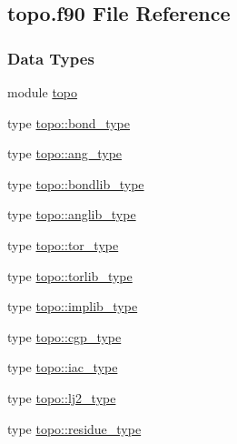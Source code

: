 \hypertarget{topo_8f90}{\subsection{topo.\-f90 File Reference}
\label{topo_8f90}
}
\subsubsection*{Data Types}
\begin{DoxyCompactItemize}
\item 
module \hyperlink{classtopo}{topo}
\item 
type \hyperlink{structtopo_1_1bond__type}{topo\-::bond\-\_\-type}
\item 
type \hyperlink{structtopo_1_1ang__type}{topo\-::ang\-\_\-type}
\item 
type \hyperlink{structtopo_1_1bondlib__type}{topo\-::bondlib\-\_\-type}
\item 
type \hyperlink{structtopo_1_1anglib__type}{topo\-::anglib\-\_\-type}
\item 
type \hyperlink{structtopo_1_1tor__type}{topo\-::tor\-\_\-type}
\item 
type \hyperlink{structtopo_1_1torlib__type}{topo\-::torlib\-\_\-type}
\item 
type \hyperlink{structtopo_1_1implib__type}{topo\-::implib\-\_\-type}
\item 
type \hyperlink{structtopo_1_1cgp__type}{topo\-::cgp\-\_\-type}
\item 
type \hyperlink{structtopo_1_1iac__type}{topo\-::iac\-\_\-type}
\item 
type \hyperlink{structtopo_1_1lj2__type}{topo\-::lj2\-\_\-type}
\item 
type \hyperlink{structtopo_1_1residue__type}{topo\-::residue\-\_\-type}
\end{DoxyCompactItemize}
